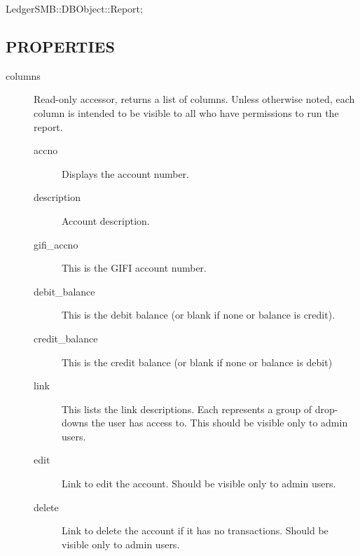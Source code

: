 \begin{description}
\begin{description}
\begin{description}
\begin{description}
\begin{description}
\begin{description}
\begin{description}
\begin{description}
\begin{description}
\begin{description}
\begin{description}
\item[{LedgerSMB::DBObject::Report;}] \mbox{}\end{description}
\subsection*{PROPERTIES\label{LedgerSMB::DBObject::Report::COA_PROPERTIES}}
\begin{description}

\item[{columns}] \mbox{}

Read-only accessor, returns a list of columns.  Unless otherwise noted, each
column is intended to be visible to all who have permissions to run the report.

\begin{description}

\item[{accno}] \mbox{}

Displays the account number.


\item[{description}] \mbox{}

Account description.


\item[{gifi\_accno}] \mbox{}

This is the GIFI account number.


\item[{debit\_balance}] \mbox{}

This is the debit balance (or blank if none or balance is credit).


\item[{credit\_balance}] \mbox{}

This is the credit balance (or blank if none or balance is debit)


\item[{link}] \mbox{}

This lists the link descriptions.  Each represents a group of drop-downs the
user has access to.  This should be visible only to admin users.


\item[{edit}] \mbox{}

Link to edit the account.  Should be visible only to admin users.


\item[{delete}] \mbox{}

Link to delete the account if it has no transactions.  Should be visible only to
admin users.


\end{description}
\end{description}
\end{description}
\end{description}
\end{description}
\end{description}
\end{description}
\end{description}
\end{description}
\end{description}
\end{description}
\end{description}
